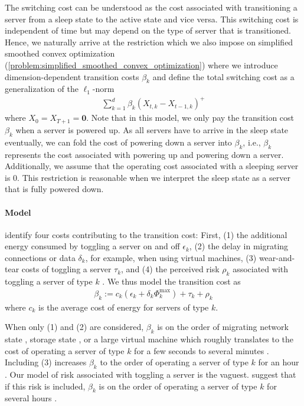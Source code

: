 The switching cost can be understood as the cost associated with transitioning a server from a sleep state to the active state and vice versa. This switching cost is independent of time but may depend on the type of server that is transitioned. Hence, we naturally arrive at the restriction which we also impose on simplified smoothed convex optimization (\autoref{problem:simplified_smoothed_convex_optimization}) where we introduce dimension-dependent transition costs $\beta_k$ and define the total switching cost as a generalization of the $\ell_1$-norm \begin{align*}
    \sum_{k=1}^d \beta_k (X_{t,k} - X_{t-1,k})^+
\end{align*} where $X_0 = X_{T+1} = \mathbf{0}$. Note that in this model, we only pay the transition cost $\beta_k$ when a server is powered up. As all servers have to arrive in the sleep state eventually, we can fold the cost of powering down a server into $\beta_k$, i.e., $\beta_k$ represents the cost associated with powering up and powering down a server. Additionally, we assume that the operating cost associated with a sleeping server is $0$. This restriction is reasonable when we interpret the sleep state as a server that is fully powered down.

\paragraph{Model} \citeauthor*{Lin2011} identify four costs contributing to the transition cost: First, (1) the additional energy consumed by toggling a server on and off $\epsilon_k$, (2) the delay in migrating connections or data $\delta_k$, for example, when using virtual machines, (3) wear-and-tear costs of toggling a server $\tau_k$, and (4) the perceived risk $\rho_k$ associated with toggling a server of type $k$ \cite{Lin2011}. We thus model the transition cost as \begin{align*}
    \beta_k := c_k(\epsilon_k + \delta_k \Phi_k^{\text{max}}) + \tau_k + \rho_k
\end{align*} where $c_k$ is the average cost of energy for servers of type $k$.

When only (1) and (2) are considered, $\beta_k$ is on the order of migrating network state \cite{Chen2008}, storage state \cite{Thereska2009}, or a large virtual machine \cite{Clark2005} which roughly translates to the cost of operating a server of type $k$ for a few seconds to several minutes \cite{Lin2011}. Including (3) increases $\beta_k$ to the order of operating a server of type $k$ for an hour \cite{Bodik2008}. Our model of risk associated with toggling a server is the vaguest. \citeauthor*{Lin2011} suggest that if this risk is included, $\beta_k$ is on the order of operating a server of type $k$ for several hours \cite{Lin2011}.

